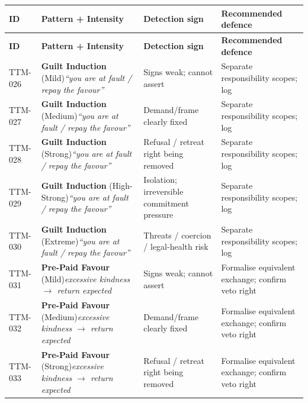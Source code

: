 \begin{small}
\begin{longtable}{@{}p{1.4cm}p{3.6cm}p{3.6cm}p{4.0cm}@{}}
\toprule
\textbf{ID} & \textbf{Pattern + Intensity} & \textbf{Detection sign} & \textbf{Recommended defence} \\
\midrule
\endfirsthead
\toprule
\textbf{ID} & \textbf{Pattern + Intensity} & \textbf{Detection sign} & \textbf{Recommended defence} \\
\midrule
\endhead
\bottomrule
\endfoot
TTM-026 & \textbf{Guilt Induction} (Mild)\newline\textit{\footnotesize ``you are at fault / repay the favour''} & Signs weak; cannot assert & Separate responsibility scopes; log \\
\addlinespace[0.2em]
TTM-027 & \textbf{Guilt Induction} (Medium)\newline\textit{\footnotesize ``you are at fault / repay the favour''} & Demand/frame clearly fixed & Separate responsibility scopes; log \\
\addlinespace[0.2em]
TTM-028 & \textbf{Guilt Induction} (Strong)\newline\textit{\footnotesize ``you are at fault / repay the favour''} & Refusal / retreat right being removed & Separate responsibility scopes; log \\
\addlinespace[0.2em]
TTM-029 & \textbf{Guilt Induction} (High-Strong)\newline\textit{\footnotesize ``you are at fault / repay the favour''} & Isolation; irreversible commitment pressure & Separate responsibility scopes; log \\
\addlinespace[0.2em]
TTM-030 & \textbf{Guilt Induction} (Extreme)\newline\textit{\footnotesize ``you are at fault / repay the favour''} & Threats / coercion / legal-health risk & Separate responsibility scopes; log \\
\addlinespace[0.2em]
TTM-031 & \textbf{Pre-Paid Favour} (Mild)\newline\textit{\footnotesize excessive kindness $\to$ return expected} & Signs weak; cannot assert & Formalise equivalent exchange; confirm veto right \\
\addlinespace[0.2em]
TTM-032 & \textbf{Pre-Paid Favour} (Medium)\newline\textit{\footnotesize excessive kindness $\to$ return expected} & Demand/frame clearly fixed & Formalise equivalent exchange; confirm veto right \\
\addlinespace[0.2em]
TTM-033 & \textbf{Pre-Paid Favour} (Strong)\newline\textit{\footnotesize excessive kindness $\to$ return expected} & Refusal / retreat right being removed & Formalise equivalent exchange; confirm veto right \\

\end{longtable}
\end{small}
